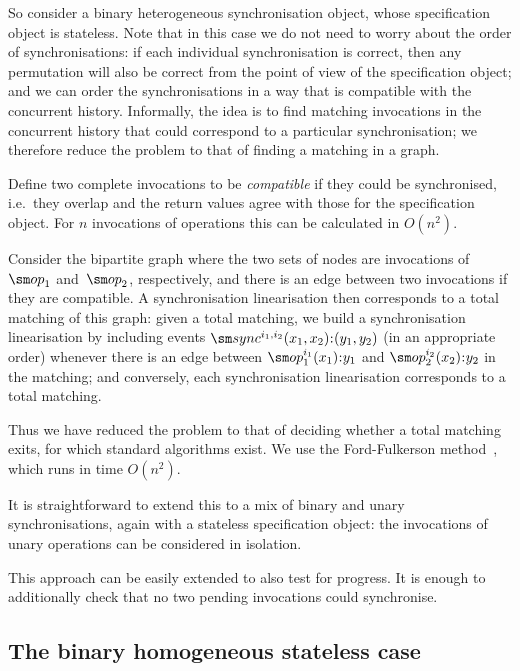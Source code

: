 So consider a binary heterogeneous synchronisation object, whose specification
object is stateless.  Note that in this case we do not need to worry about the
order of synchronisations: if each individual synchronisation is correct, then
any permutation will also be correct from the point of view of the
specification object; and we can order the synchronisations in a way that is
compatible with the concurrent history.  Informally, the idea is to find
matching invocations in the concurrent history that could correspond to a
particular synchronisation; we therefore reduce the problem to that of finding
a matching in a graph.

Define two complete invocations to be \emph{compatible} if they could be
synchronised, i.e.~they overlap and the return values agree with those for the
specification object.  For $n$ invocations of operations this can be
calculated in $O(n^2)$.

Consider the bipartite graph where the two sets of nodes are invocations
of~$\op_1$ and~$\op_2$, respectively, and there is an edge between two
invocations if they are compatible.  A synchronisation linearisation then
corresponds to a total matching of this graph: given a total matching, we
build a synchronisation linearisation by including events
$\sync^{i_1,i_2}(x_1,x_2)\::(y_1,y_2)$ (in an appropriate order) whenever
there is an edge between $\op_1^{i_1}(x_1)\::y_1$ and $\op_2^{i_2}(x_2)\::y_2$
in the matching; and conversely, each synchronisation linearisation
corresponds to a total matching.

Thus we have reduced the problem to that of deciding whether a total matching
exits, for which standard algorithms exist.  We use the Ford-Fulkerson
method~\cite{ford-fulkerson}, which runs in time $O(n^2)$.

It is straightforward to extend this to a mix of binary and unary
synchronisations, again with a stateless specification object: the invocations
of unary operations can be considered in isolation.  

This approach can be easily extended to also test for progress.  It is enough
to additionally check that no two pending invocations could synchronise.


\subsection{The binary homogeneous stateless case}
\label{sec:binary-homogeneous} 


